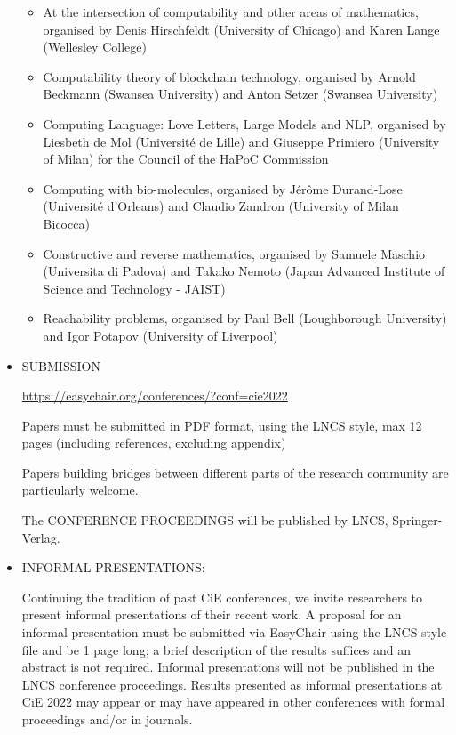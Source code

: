 \documentclass[prodmode,acmtecs]{acmsmall} %
\begin{document}
\begin{itemize}
\begin{itemize}\item  At the intersection of computability and other areas of mathematics, organised by Denis Hirschfeldt (University of Chicago) and Karen Lange (Wellesley College)
\item  Computability theory of blockchain technology, organised by Arnold Beckmann (Swansea University) and Anton Setzer (Swansea University)
\item  Computing Language: Love Letters, Large Models and NLP, organised by Liesbeth de Mol (Université de Lille) and Giuseppe Primiero (University of Milan) for the Council of the HaPoC Commission
\item  Computing with bio-molecules, organised by Jérôme Durand-Lose (Université d'Orleans) and Claudio Zandron (University of Milan Bicocca)
\item  Constructive and reverse mathematics, organised by Samuele Maschio (Universita di Padova) and Takako Nemoto (Japan Advanced Institute of Science and Technology - JAIST)
\item  Reachability problems, organised by Paul Bell (Loughborough University) and Igor Potapov (University of Liverpool)
\end{itemize} 
\item  SUBMISSION 
 
  \href{https://easychair.org/conferences/?conf=cie2022}{https://easychair.org/conferences/?conf=cie2022} 
 
  Papers must be submitted in PDF format, using the LNCS style, max 12 pages (including references, excluding appendix)  
 
  Papers building bridges between different parts of the research community are particularly welcome. 
 
  The CONFERENCE PROCEEDINGS will be published by LNCS, Springer-Verlag. 
 
\item  INFORMAL PRESENTATIONS: 
 
  Continuing the tradition of past CiE conferences, we invite researchers to present informal presentations of their recent work. A proposal for an informal presentation must be submitted via EasyChair using the LNCS style file and be 1 page long; a brief description of the results suffices and an abstract is not required. Informal presentations will not be published in the LNCS conference proceedings. Results presented as informal presentations at CiE 2022 may appear or may have appeared in other conferences with formal proceedings and/or in journals.  
 

\end{itemize}
\end{document}
